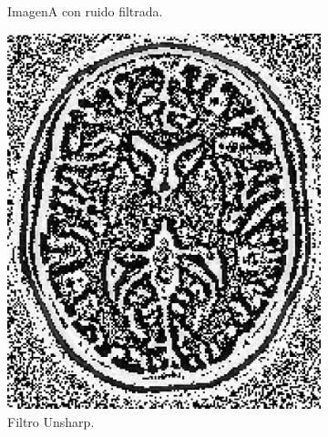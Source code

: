 \documentclass[letterpaper,12pt]{article}
\theoremstyle{plain}
\begin{document}
\begin{figure}[h]
\begin{subfigure}[h]{0.32\linewidth}
            \caption{ImagenA con ruido filtrada.} 
         \end{subfigure}
         \begin{subfigure}[h]{0.32\linewidth}
            \centering
            \includegraphics[width=\textwidth]{Figuras/unsharp.png}
            \caption{Filtro Unsharp.} 
         \end{subfigure}
         \begin{subfigure}[h]{0.32\linewidth}
            \centering

\end{subfigure}
\end{figure}
\end{document}

